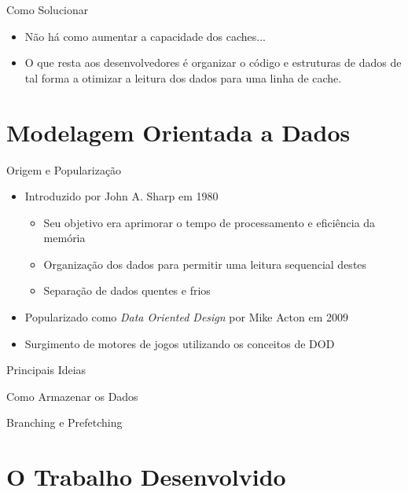 \documentclass{beamer}
\begin{document}
\begin{frame}[t]{Como Solucionar}
    \begin{itemize}
        \item Não há como aumentar a capacidade dos caches...
        \item O que resta aos desenvolvedores é organizar o código e estruturas de dados
              de tal forma a otimizar a leitura dos dados para uma linha de cache.
    \end{itemize}
\end{frame}

\section{Modelagem Orientada a Dados}

\frame{\tableofcontents[currentsection]}

\begin{frame}[t]{Origem e Popularização}
    \begin{itemize}
        \item Introduzido por John A. Sharp em 1980
            \begin{itemize}
                \item Seu objetivo era aprimorar o tempo de processamento e eficiência da memória
                \item Organização dos dados para permitir uma leitura sequencial destes
                \item Separação de dados quentes e frios
            \end{itemize}
        \item Popularizado como \textit{Data Oriented Design} por Mike Acton em 2009
        \item Surgimento de motores de jogos utilizando os conceitos de DOD
    \end{itemize}
\end{frame}

\begin{frame}[t]{Principais Ideias}
\end{frame}

\begin{frame}[t]{Como Armazenar os Dados}
\end{frame}

\begin{frame}[t]{Branching e Prefetching}
\end{frame}

\section{O Trabalho Desenvolvido}
\end{document}
